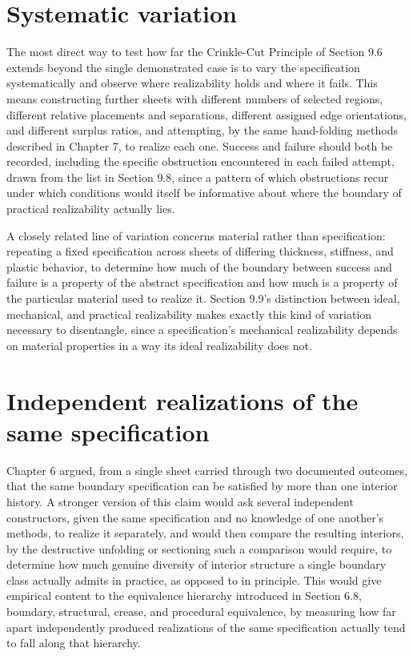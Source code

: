 \documentclass[11pt,oneside]{book}
\begin{document}
\hypertarget{systematic-variation}{%
\section{Systematic variation}\label{systematic-variation}}

The most direct way to test how far the Crinkle-Cut Principle of Section
9.6 extends beyond the single demonstrated case is to vary the
specification systematically and observe where realizability holds and
where it fails. This means constructing further sheets with different
numbers of selected regions, different relative placements and
separations, different assigned edge orientations, and different surplus
ratios, and attempting, by the same hand-folding methods described in
Chapter 7, to realize each one. Success and failure should both be
recorded, including the specific obstruction encountered in each failed
attempt, drawn from the list in Section 9.8, since a pattern of which
obstructions recur under which conditions would itself be informative
about where the boundary of practical realizability actually lies.

A closely related line of variation concerns material rather than
specification: repeating a fixed specification across sheets of
differing thickness, stiffness, and plastic behavior, to determine how
much of the boundary between success and failure is a property of the
abstract specification and how much is a property of the particular
material used to realize it. Section 9.9's distinction between ideal,
mechanical, and practical realizability makes exactly this kind of
variation necessary to disentangle, since a specification's mechanical
realizability depends on material properties in a way its ideal
realizability does not.

\hypertarget{independent-realizations-of-the-same-specification}{%
\section{Independent realizations of the same
specification}\label{independent-realizations-of-the-same-specification}}

Chapter 6 argued, from a single sheet carried through two documented
outcomes, that the same boundary specification can be satisfied by more
than one interior history. A stronger version of this claim would ask
several independent constructors, given the same specification and no
knowledge of one another's methods, to realize it separately, and would
then compare the resulting interiors, by the destructive unfolding or
sectioning such a comparison would require, to determine how much
genuine diversity of interior structure a single boundary class actually
admits in practice, as opposed to in principle. This would give
empirical content to the equivalence hierarchy introduced in Section
6.8, boundary, structural, crease, and procedural equivalence, by
measuring how far apart independently produced realizations of the same
specification actually tend to fall along that hierarchy.
\end{document}
